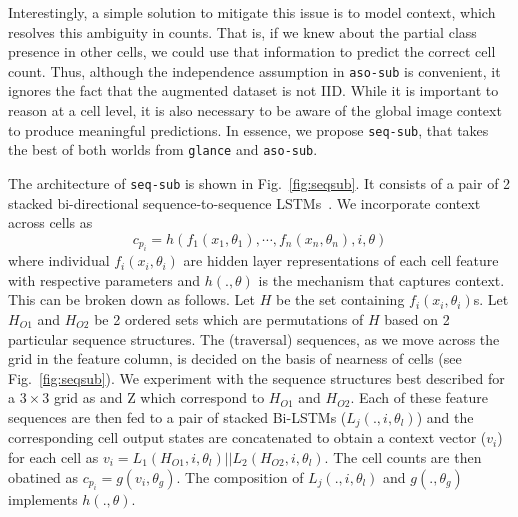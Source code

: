 \documentclass[10pt,twocolumn,letterpaper]{article}
\newcommand{\sub}{\texttt{aso-sub}\xspace}
\newcommand{\seq}{\texttt{seq-sub}\xspace}
\newcommand{\glance}{\texttt{glance}\xspace}
\begin{document}
Interestingly, a simple solution to mitigate this issue is to model context, which resolves this ambiguity in counts. That is, if we knew about the partial class presence in other cells, we could use that information to predict the correct cell count. Thus, although the independence assumption in \sub is convenient, it ignores the fact that the augmented dataset is not IID. While it is important to reason at a cell level, it is also necessary to be aware of the global image context to produce meaningful predictions. In essence, we propose \seq, that takes the best of both worlds from \glance and \sub.

\par \noindent
The architecture of \seq{} is shown in Fig.~\ref{fig:seqsub}. It consists of a pair of 2 stacked bi-directional sequence-to-sequence LSTMs~\cite{Schuster1997BidirectionalRN}. We incorporate context across cells as 
\begin{equation}
c_{p_{i}} = h(f_1(x_1,\theta_1),\cdots,f_n(x_n,\theta_n),i,\theta)
\end{equation}
where individual $f_i(x_i,\theta_i)$ are hidden layer representations of each cell feature with respective parameters and $h(.,\theta)$ is the mechanism that captures context. This can be broken down as follows. Let $H$ be the set containing $f_i(x_i,\theta_i)$s. Let $H_{O1}$ and $H_{O2}$ be 2 ordered sets which are permutations of $H$ based on 2 particular sequence structures. The (traversal) sequences, as we move across the grid in the feature column, is decided on the basis of nearness of cells  (see Fig.~\ref{fig:seqsub}). We experiment with the sequence structures best described for a $3\times3$ grid as  and Z which correspond to $H_{O1}$ and $H_{O2}$. Each of these feature sequences are then fed to a pair of stacked Bi-LSTMs ($L_{j}(.,i,\theta_{l})$) and the corresponding cell output states are concatenated to obtain a context vector ($v_{i}$) for each cell as $v_{i} = L_{1}(H_{O1},i,\theta_{l})||L_{2}(H_{O2},i,\theta_{l})$. The cell counts are then obatined as $c_{p_{i}} = g(v_{i},\theta_{g})$. The composition of $L_{j}(.,i,\theta_{l})$ and $g(.,\theta_{g})$ implements $h(.,\theta)$.




\begin{comment}
\subsection{Counting by Detection}
\begin{itemize}
\item Explain what Fast-RCNN does briefly
\item mention the detection pipeline
\item explain how we tune the detector to generate better counts
\item NMS threshold and count threshold
\item show an example where the difference between thresholds is apparent
\end{itemize}
\end{comment}
\end{document}
